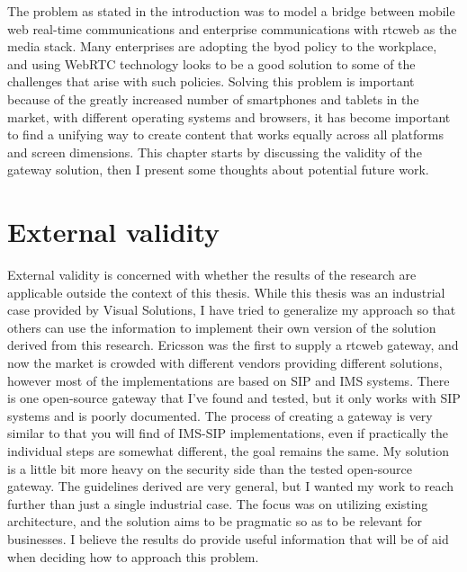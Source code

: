 
The problem as stated in the introduction was to model a bridge between mobile web real-time communications and enterprise communications with \gls{rtcweb} as the media stack. Many enterprises are adopting the \gls{byod} policy to the workplace, and using WebRTC technology looks to be a good solution to some of the challenges that arise with such policies. Solving this problem is important because of the greatly increased number of smartphones and tablets in the market, with different operating systems and browsers, it has become important to find a unifying way to create content that works equally across all platforms and screen dimensions. This chapter starts by discussing the validity of the gateway solution, then I present some thoughts about potential future work.


\section{External validity}
External validity is concerned with whether the results of the research are applicable outside the context of this thesis. While this thesis was an industrial case provided by Visual Solutions, I have tried to generalize my approach so that others can use the information to implement their own version of the solution derived from this research. Ericsson was the first to supply a \gls{rtcweb} gateway, and now the market is crowded with different vendors providing different solutions, however most of the implementations are based on SIP and IMS systems. There is one open-source gateway that I've found and tested, but it only works with SIP systems and is poorly documented. The process of creating a gateway is very similar to that you will find of IMS-SIP implementations, even if practically the individual steps are somewhat different, the goal remains the same. My solution is a little bit more heavy on the security side than the tested open-source gateway. The guidelines derived are very general, but I wanted my work to reach further than just a single industrial case. The focus was on utilizing existing architecture, and the solution aims to be pragmatic so as to be relevant for businesses. I believe the results do provide useful information that will be of aid when deciding how to approach this problem.

